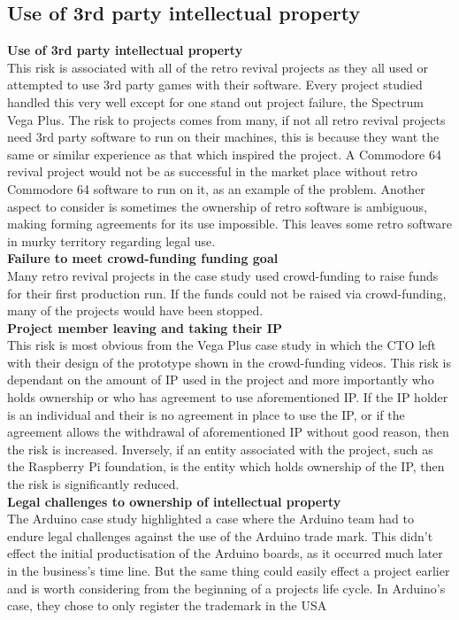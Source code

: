 \subsection{Use of 3rd party intellectual property}
\textbf{Use of 3rd party intellectual property}\\
This risk is associated with all of the retro revival projects as they all used or attempted to use 3rd party games with their software. Every project studied handled this very well except for one stand out project failure, the Spectrum Vega Plus. The risk to projects comes from many, if not all retro revival projects need 3rd party software to run on their machines, this is because they want the same or similar experience as that which inspired the project. A Commodore 64 revival project would not be as successful in the market place without retro Commodore 64 software to run on it, as an example of the problem. Another aspect to consider is sometimes the ownership of retro software is ambiguous, making forming agreements for its use impossible. This leaves some retro software in murky territory regarding legal use. \\

\textbf{Failure to meet crowd-funding funding goal}\\
Many retro revival projects in the case study used crowd-funding to raise funds for their first production run. If the funds could not be raised via crowd-funding, many of the projects would have been stopped.\\

\textbf{Project member leaving and taking their IP }\\
This risk is most obvious from the Vega Plus case study in which the CTO left with their design of the prototype shown in the crowd-funding videos. This risk is dependant on the amount of IP used in the project and more importantly who holds ownership or who has agreement to use aforementioned IP. If the IP holder is an individual and their is no agreement in place to use the IP, or if the agreement allows the withdrawal of aforementioned IP without good reason, then the risk is increased. Inversely, if an entity associated with the project, such as the Raspberry Pi foundation, is the entity which holds ownership of the IP, then the risk is significantly reduced. \\

\textbf{Legal challenges to ownership of intellectual property}\\
The Arduino case study highlighted a case where the Arduino team had to endure legal challenges against the use of the Arduino trade mark. This didn't effect the initial productisation of the Arduino boards, as it occurred much later in the business's time line. But the same thing could easily effect a project earlier and is worth considering from the beginning of a projects life cycle. In Arduino's case, they chose to only register the trademark in the USA

